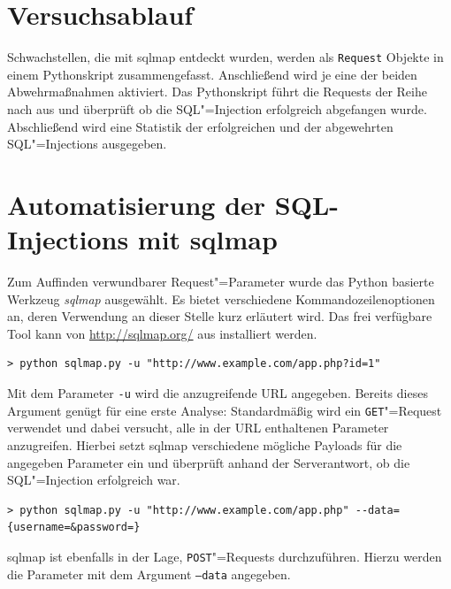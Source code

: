 \section{Versuchsablauf}

Schwachstellen, die mit sqlmap entdeckt wurden, werden als \texttt{Request} Objekte in einem Pythonskript zusammengefasst. Anschließend wird je eine der beiden Abwehrmaßnahmen aktiviert. Das Pythonskript führt die Requests der Reihe nach aus und überprüft ob die SQL"=Injection erfolgreich abgefangen wurde. Abschließend wird eine Statistik der erfolgreichen und der abgewehrten SQL"=Injections ausgegeben.


\section{Automatisierung der SQL-Injections mit sqlmap}

Zum Auffinden verwundbarer Request"=Parameter wurde das Python basierte Werkzeug \emph{sqlmap} ausgewählt. Es bietet verschiedene Kommandozeilenoptionen an, deren Verwendung an dieser Stelle kurz erläutert wird. Das frei verfügbare Tool kann von \url{http://sqlmap.org/} aus installiert werden.

\begin{listing}
\begin{verbatim}
> python sqlmap.py -u "http://www.example.com/app.php?id=1"
\end{verbatim}
\end{listing}

Mit dem Parameter \texttt{-u} wird die anzugreifende URL angegeben. Bereits dieses Argument genügt für eine erste Analyse: Standardmäßig wird ein \texttt{GET}"=Request verwendet und dabei versucht, alle in der URL enthaltenen Parameter anzugreifen. Hierbei setzt sqlmap verschiedene mögliche Payloads für die angegeben Parameter ein und überprüft anhand der Serverantwort, ob die SQL"=Injection erfolgreich war.

\begin{listing}
\begin{verbatim}
> python sqlmap.py -u "http://www.example.com/app.php" --data={username=&password=}
\end{verbatim}
\end{listing}

sqlmap ist ebenfalls in der Lage, \texttt{POST}"=Requests durchzuführen. Hierzu werden die Parameter mit dem Argument \texttt{--data} angegeben.

